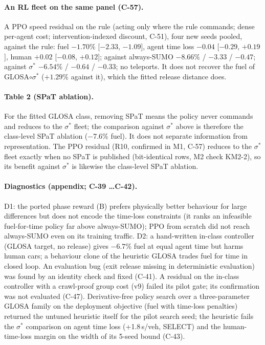 \documentclass[11pt]{article}
\begin{document}
\paragraph{An RL fleet on the same panel (C-57).} A PPO speed residual on the rule (acting only where the rule commands; dense per-agent
cost; intervention-indexed discount, C-51), four new seeds pooled, against the rule: fuel $-1.70\%$ [$-2.33$, $-1.09$], agent time loss
$-0.04$ [$-0.29$, $+0.19$], human $+0.02$ [$-0.08$, $+0.12$]; against always-SUMO $-8.66\%$ / $-3.33$ / $-0.47$; against $\sigma^*$
$-6.54\%$ / $-0.64$ / $-0.33$; no teleports. It does not recover the fuel of GLOSA$\circ\sigma^*$ ($+1.29\%$ against it), which the fitted
release distance does.
\paragraph{Table 2 (SPaT ablation).} For the fitted GLOSA class, removing SPaT means the policy never commands and reduces to the
$\sigma^*$ fleet; the comparison against $\sigma^*$ above is therefore the class-level SPaT ablation ($-7.6\%$ fuel). It does not separate
information from representation. The PPO residual (R10, confirmed in M1, C-57) reduces to the $\sigma^*$ fleet exactly when no SPaT is
published (bit-identical rows, M2 check KM2-2), so its benefit against $\sigma^*$ is likewise the class-level SPaT ablation.
\paragraph{Diagnostics (appendix; C-39 \dots C-42).} D1: the ported phase reward (B) prefers physically better behaviour for large
differences but does not encode the time-loss constraints (it ranks an infeasible fuel-for-time policy far above always-SUMO); PPO from
scratch did not reach always-SUMO even on its training traffic. D2: a hand-written in-class controller (GLOSA target, no release) gives
$-6.7\%$ fuel at equal agent time but harms human cars; a behaviour clone of the heuristic GLOSA trades fuel for time in closed loop.
An evaluation bug (exit release missing in deterministic evaluation) was found by an identity check and fixed (C-41).
A residual on the in-class controller with a crawl-proof group cost (v9) failed its pilot gate; its confirmation was not evaluated (C-47).
Derivative-free policy search over a three-parameter GLOSA family on the deployment objective (fuel with time-loss penalties) returned
the untuned heuristic itself for the pilot search seed; the heuristic fails the $\sigma^*$ comparison on agent time loss (+1.8\,s/veh,
SELECT) and the human-time-loss margin on the width of its 5-seed bound (C-43).
\end{document}
